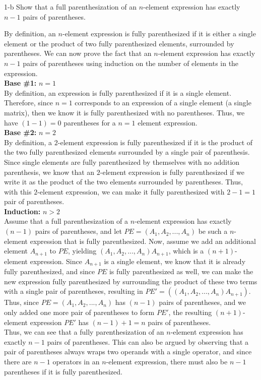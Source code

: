 \documentclass[11pt]{article}
\begin{document}
\begin{prob}{1-b}
Show that a full parenthesization of an $n$-element expression has exactly $n-1$ pairs of parentheses.
\end{prob}
\begin{sol}

By definition, an $n$-element expression is fully parenthesized if it is either a single element or the product of two fully parenthesized elements, surrounded by parentheses. We can now prove the fact that an $n$-element expression has exactly $n-1$ pairs of parentheses using induction on the number of elements in the expression. \\
\textbf{Base \#1:} $n = 1$ \\
By definition, an expression is fully parenthesized if it is a single element. Therefore, since $n=1$ corresponds to an expression of a single element (a single matrix), then we know it is fully parenthesized with no parentheses. Thus, we have $(1-1) = 0$ parentheses for a $n = 1$ element expression.\\
\textbf{Base \#2:} $n = 2$ \\
By definition, a $2$-element expression is fully parenthesized if it is the product of the two fully parenthesized elements surrounded by a single pair of parenthesis. Since single elements are fully parenthesized by themselves with no addition parenthesis, we know that an $2$-element expression is fully parenthesized if we write it as the product of the two elements surrounded by parentheses. Thus, with this $2$-element expression, we can make it fully parenthesized with $2-1 = 1$ pair of parentheses. \\
\textbf{Induction:} $n > 2$ \\
Assume that a full parenthesization of a $n$-element expression has exactly $(n-1)$ pairs of parentheses, and let $PE = (A_1, A_2, ..., A_{n})$ be such a $n$-element expression that is fully parenthesized. Now, assume we add an additional element $A_{n+1}$ to $PE$, yielding $(A_1, A_2, ..., A_{n})A_{n+1}$, which is a $(n+1)$-element expression. Since $A_{n+1}$ is a single element, we know that it is already fully parenthesized, and since $PE$ is fully parenthesized as well, we can make the new expression fully parenthesized by surrounding the product of these two terms with a single pair of parentheses, resulting in $PE' = ((A_1, A_2, ..., A_{n})A_{n+1})$. Thus, since $PE = (A_1, A_2, ..., A_{n})$ has $(n - 1)$ pairs of parentheses, and we only added one more pair of parentheses to form $PE'$, the resulting $(n+1)$-element expression $PE'$ has $(n - 1) + 1 = n$ pairs of parentheses. \\ 

Thus, we can see that a fully parenthesization of an $n$-element expression has exactly $n-1$ pairs of parentheses. This can also be argued by observing that a pair of parentheses always wraps two operands with a single operator, and since there are $n-1$ operators in an $n$-element expression, there must also be $n-1$ parentheses if it is fully parenthesized.
\end{sol}
\end{document}
